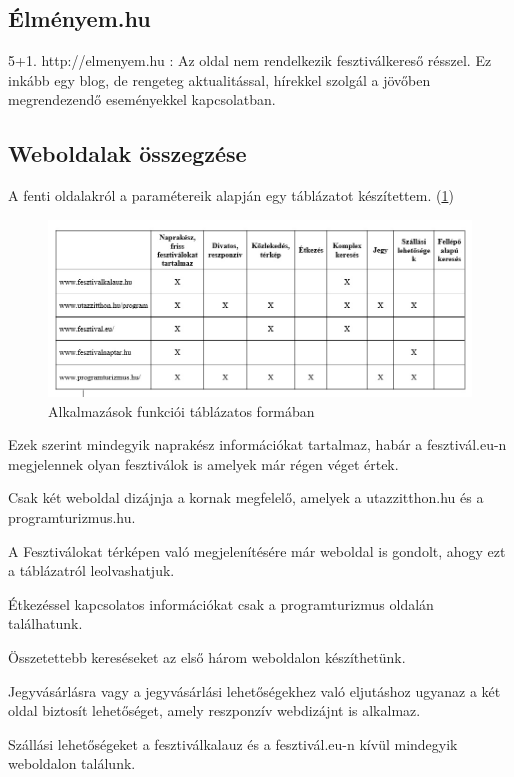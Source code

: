 \subsection{Élményem.hu}

5+1. http://elmenyem.hu : Az oldal nem rendelkezik fesztiválkereső résszel. Ez inkább egy blog, de rengeteg aktualitással, hírekkel szolgál a jövőben megrendezendő eseményekkel kapcsolatban. 

\subsection{Weboldalak összegzése}

A fenti oldalakról a paramétereik alapján egy táblázatot készítettem. (\ref{fig:apps}) 

\begin{figure}
\centering
\includegraphics[scale=0.64]{kepek/alkalmazasok.jpg}
\caption{Alkalmazások funkciói táblázatos formában}
\label{fig:apps}
\end{figure}

Ezek szerint mindegyik naprakész információkat tartalmaz, habár a fesztivál.eu-n megjelennek olyan fesztiválok is amelyek már régen véget értek.

Csak két weboldal dizájnja a kornak megfelelő, amelyek a utazzitthon.hu és a programturizmus.hu.

A Fesztiválokat térképen való megjelenítésére már weboldal is gondolt, ahogy ezt a táblázatról leolvashatjuk.

Étkezéssel kapcsolatos információkat csak a programturizmus oldalán találhatunk.

Összetettebb kereséseket az első három weboldalon készíthetünk.

Jegyvásárlásra vagy a jegyvásárlási lehetőségekhez való eljutáshoz ugyanaz a két oldal biztosít lehetőséget, amely reszponzív webdizájnt is alkalmaz.

Szállási lehetőségeket a fesztiválkalauz és a fesztivál.eu-n kívül mindegyik weboldalon találunk.


